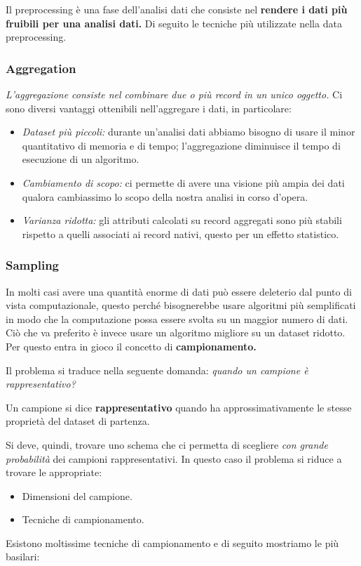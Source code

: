 Il preprocessing è una fase dell'analisi dati che consiste nel \textbf{rendere i dati più fruibili per una analisi dati.} Di seguito le tecniche più utilizzate nella data preprocessing.

\subsubsection{Aggregation}
\textit{L'aggregazione consiste nel combinare due o più record in un unico oggetto.}
Ci sono diversi vantaggi ottenibili nell'aggregare i dati, in particolare:

\begin{itemize}
	\item \textit{Dataset più piccoli:} durante un'analisi dati abbiamo bisogno di usare il minor quantitativo di memoria e di tempo; l'aggregazione diminuisce il tempo di esecuzione di un algoritmo.
	\item \textit{Cambiamento di scopo:} ci permette di avere una visione più ampia dei dati qualora cambiassimo lo scopo della nostra analisi in corso d'opera.
	\item \textit{Varianza ridotta:} gli attributi calcolati su record aggregati sono più stabili rispetto a quelli associati ai record nativi, questo per un effetto statistico.
\end{itemize}


\subsubsection{Sampling}
In molti casi avere una quantità enorme di dati può essere deleterio dal punto di vista computazionale, questo perché bisognerebbe usare algoritmi più semplificati in modo che la computazione possa essere svolta su un maggior numero di dati. Ciò che va preferito è invece usare un algoritmo migliore su un dataset ridotto. Per questo entra in gioco il concetto di \textbf{campionamento.}

Il problema si traduce nella seguente domanda: \textit{quando un campione è rappresentativo?}

\begin{defn}
	Un campione si dice \textbf{rappresentativo} quando ha approssimativamente le stesse proprietà del dataset di partenza.
\end{defn}

Si deve, quindi, trovare uno schema che ci permetta di scegliere \textit{con grande probabilità} dei campioni rappresentativi. In questo caso il problema si riduce a trovare le appropriate:
\begin{itemize}
	\item Dimensioni del campione.
	\item Tecniche di campionamento.
\end{itemize}
Esistono moltissime tecniche di campionamento e di seguito  mostriamo le più basilari:

